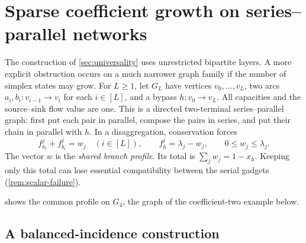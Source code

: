 \section{Sparse coefficient growth on series--parallel networks}\label{sec:sp-growth}

The construction of \cref{sec:universality} uses unrestricted bipartite
layers. A more explicit obstruction occurs on a much narrower graph family
if the number of simplex states may grow.
For $L\ge1$, let $G_L$ have vertices $v_0,\ldots,v_L$, two arcs
$a_i,b_i:v_{i-1}\to v_i$ for each $i\in[L]$, and a bypass
$h:v_0\to v_L$. All capacities and the source--sink flow value are one.
This is a directed two-terminal series--parallel graph: first put each
pair in parallel, compose the pairs in series, and put their chain in
parallel with $h$. In a disaggregation, conservation forces
\begin{equation}\label{eq:chain-profile}
 f^j_{a_i}+f^j_{b_i}=w_j\quad(i\in[L]),\qquad
 f^j_h=\lambda_j-w_j,
 \qquad 0\le w_j\le\lambda_j.
\end{equation}
The vector $w$ is the \emph{shared branch profile}. Its total is
$\sum_jw_j=1-x_h$. Keeping only this total can lose essential
compatibility between the serial gadgets (\cref{rem:scalar-failure}).


 shows the common profile on $G_4$, the graph of the
coefficient-two example below.

\subsection{A balanced-incidence construction}


